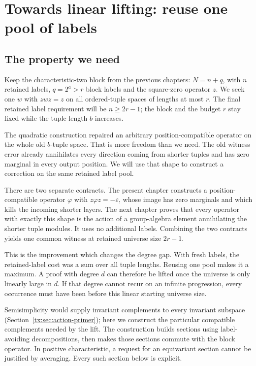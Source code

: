 \chapter{Towards linear lifting: reuse one pool of labels}\label{tx:sec:linear-construction}
\label{tx:ch:linear-layers}
\section*{The property we need}
Keep the characteristic-two block from the previous chapters:
$N=n+q$, with $n$ retained labels, $q=2^a>r$ block labels and
the square-zero operator $z$. We seek one $w$ with $zwz=z$ on
all ordered-tuple spaces of lengths at most $r$. The final retained
label requirement will be $n\ge2r-1$; the block and the budget $r$
stay fixed while the tuple length $b$ increases.

The quadratic construction repaired an arbitrary position-compatible
operator on the whole old $b$-tuple space. That is more freedom than
we need. The old witness error already annihilates every direction
coming from shorter tuples and has zero marginal in every output
position. We will use that shape to construct a correction on the
same retained label pool.

There are two separate contracts. The present chapter constructs a
position-compatible operator $\varphi$ with $z\varphi z=-\varepsilon$,
whose image has zero marginals and which kills the incoming shorter
layers. The next chapter proves that every operator with exactly
this shape is the action of a group-algebra element annihilating the
shorter tuple modules. It uses no additional labels. Combining the
two contracts yields one common witness at retained universe size $2r-1$.

This is the improvement which changes the degree gap. With fresh labels,
the retained-label cost was a sum over all tuple lengths. Reusing one
pool makes it a maximum. A proof with degree $d$ can therefore be lifted
once the universe is only linearly large in $d$. If that degree cannot
recur on an infinite progression, every occurrence must have been
before this linear starting universe size.

Semisimplicity would supply invariant complements to every invariant
subspace (Section~\ref{tx:sec:action-primer}); here we construct the
particular compatible complements needed by the lift.
The construction builds sections using label-avoiding decompositions,
then makes those sections commute with the block operator. In
positive characteristic, a request for an equivariant section cannot
be justified by averaging. Every such section below is explicit.

